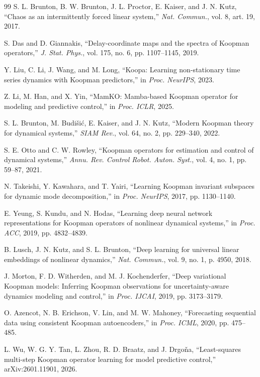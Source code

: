 \documentclass[journal]{IEEEtran}
\begin{document}
\begin{thebibliography}{99}
S. L. Brunton, B. W. Brunton, J. L. Proctor, E. Kaiser, and J. N. Kutz, ``Chaos as an intermittently forced linear system,'' \emph{Nat. Commun.}, vol. 8, art. 19, 2017.

S. Das and D. Giannakis, ``Delay-coordinate maps and the spectra of Koopman operators,'' \emph{J. Stat. Phys.}, vol. 175, no. 6, pp. 1107--1145, 2019.

Y. Liu, C. Li, J. Wang, and M. Long, ``Koopa: Learning non-stationary time series dynamics with Koopman predictors,'' in \emph{Proc. NeurIPS}, 2023.

Z. Li, M. Han, and X. Yin, ``MamKO: Mamba-based Koopman operator for modeling and predictive control,'' in \emph{Proc. ICLR}, 2025.

S. L. Brunton, M. Budi\v{s}i\'c, E. Kaiser, and J. N. Kutz, ``Modern Koopman theory for dynamical systems,'' \emph{SIAM Rev.}, vol. 64, no. 2, pp. 229--340, 2022.

S. E. Otto and C. W. Rowley, ``Koopman operators for estimation and control of dynamical systems,'' \emph{Annu. Rev. Control Robot. Auton. Syst.}, vol. 4, no. 1, pp. 59--87, 2021.

N. Takeishi, Y. Kawahara, and T. Yairi, ``Learning Koopman invariant subspaces for dynamic mode decomposition,'' in \emph{Proc. NeurIPS}, 2017, pp. 1130--1140.

E. Yeung, S. Kundu, and N. Hodas, ``Learning deep neural network representations for Koopman operators of nonlinear dynamical systems,'' in \emph{Proc. ACC}, 2019, pp. 4832--4839.

B. Lusch, J. N. Kutz, and S. L. Brunton, ``Deep learning for universal linear embeddings of nonlinear dynamics,'' \emph{Nat. Commun.}, vol. 9, no. 1, p. 4950, 2018.

J. Morton, F. D. Witherden, and M. J. Kochenderfer, ``Deep variational Koopman models: Inferring Koopman observations for uncertainty-aware dynamics modeling and control,'' in \emph{Proc. IJCAI}, 2019, pp. 3173--3179.

O. Azencot, N. B. Erichson, V. Lin, and M. W. Mahoney, ``Forecasting sequential data using consistent Koopman autoencoders,'' in \emph{Proc. ICML}, 2020, pp. 475--485.

L. Wu, W. G. Y. Tan, L. Zhou, R. D. Braatz, and J. Drgo\v{n}a, ``Least-squares multi-step Koopman operator learning for model predictive control,'' arXiv:2601.11901, 2026.


\end{thebibliography}
\end{document}
